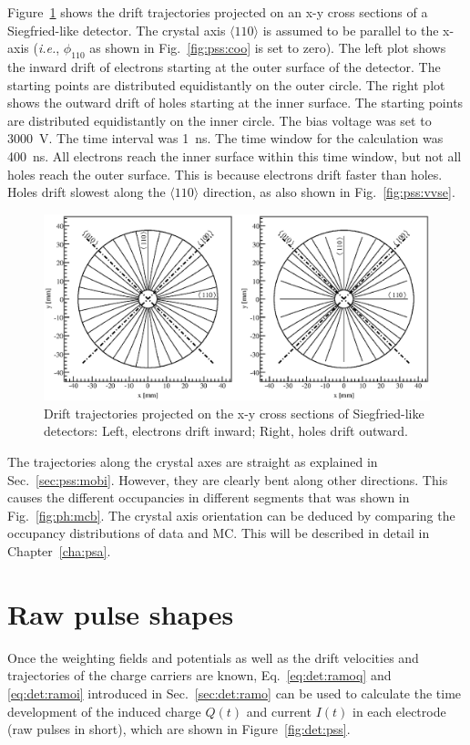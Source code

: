 Figure~\ref{fig:pss:trjs} shows the drift trajectories projected on an
x-y cross sections of a Siegfried-like detector. The crystal axis
$\langle 110 \rangle$ is assumed to be parallel to the x-axis
(\textit{i.e.}, $\phi_{110}$ as shown in Fig.~\ref{fig:pss:coo} is set
to zero). The left plot shows the inward drift of electrons starting
at the outer surface of the detector. The starting points are
distributed equidistantly on the outer circle.  The right plot shows
the outward drift of holes starting at the inner surface.  The
starting points are distributed equidistantly on the inner circle.
The bias voltage was set to 3000~V. The time interval was 1~ns.  The
time window for the calculation was 400~ns.  All electrons reach the
inner surface within this time window, but not all holes reach the
outer surface.  This is because electrons drift faster than holes.
Holes drift slowest along the $\langle 110 \rangle$ direction, as also
shown in Fig.~\ref{fig:pss:vvse}.
\begin{figure}[tbhp] 
\centering 
\includegraphics[width=\textwidth]{trjs} 
\caption{Drift trajectories projected on the x-y cross sections of
Siegfried-like detectors: Left, electrons drift inward; Right, holes
drift outward.}
\label{fig:pss:trjs} 
\end{figure} 
 
The trajectories along the crystal axes are straight as explained in
Sec.~\ref{sec:pss:mobi}.  However, they are clearly bent along other
directions.  This causes the different occupancies in different
segments that was shown in Fig.~\ref{fig:ph:mcb}.  The crystal axis
orientation can be deduced by comparing the occupancy distributions of
data and MC.  This will be described in detail in
Chapter~\ref{cha:psa}.
 
 
\section{Raw pulse shapes} 
\label{sec:pss:ps} 
Once the weighting fields and potentials as well as the drift
velocities and trajectories of the charge carriers are known,
Eq.~\ref{eq:det:ramoq} and \ref{eq:det:ramoi} introduced in
Sec.~\ref{sec:det:ramo} can be used to calculate the time development
of the induced charge $Q(t)$ and current $I(t)$ in each electrode (raw
pulses in short), which are shown in Figure~\ref{fig:det:pss}.

